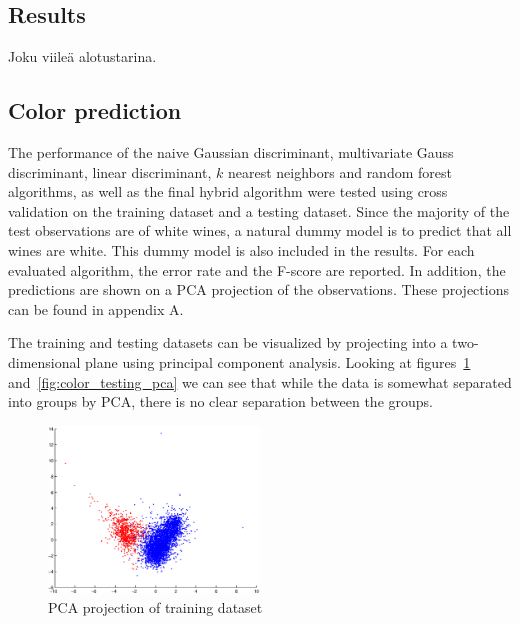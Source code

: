 \documentclass[twoside]{article}
\begin{document}
\begin{multicols}{2}


\section{Results}

Joku viileä alotustarina.

\subsection{Color prediction}

The performance of the naive Gaussian discriminant, multivariate Gauss discriminant, linear discriminant, $k$ nearest neighbors and random forest
algorithms, as well as the final hybrid algorithm were tested using cross validation on the training dataset and a testing dataset.
Since the majority of the test observations are of white wines, a natural dummy model is to predict that all wines are white. This dummy model
is also included in the results.
For each evaluated algorithm, the error rate and the F-score are reported. In addition, the predictions are shown on a PCA projection
of the observations. These projections can be found in appendix A.

The training and testing datasets can be visualized by projecting into a two-dimensional plane using principal component analysis. Looking at
figures~\ref{fig:color_training_pca} and~\ref{fig:color_testing_pca} we can see that while the data is somewhat separated into groups by PCA,
there is no clear separation between the groups.

\begin{figure}[H]
\centering
\includegraphics[width=0.5\textwidth]{trainingpca}
\caption{PCA projection of training dataset}
\label{fig:color_training_pca}
\end{figure}


\end{multicols}
\end{document}
